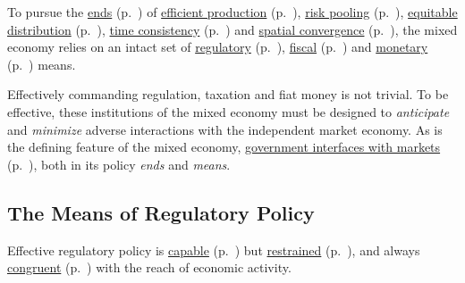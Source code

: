 To pursue the \hyperref[sec:ends]{ends} (p.~\pageref{sec:ends}) of \hyperref[sec:production]{efficient production} (p.~\pageref{sec:production}), \hyperref[sec:risk]{risk pooling} (p.~\pageref{sec:risk}), \hyperref[sec:distribution]{equitable distribution} (p.~\pageref{sec:distribution}), \hyperref[sec:time]{time consistency} (p.~\pageref{sec:time}) and \hyperref[sec:space]{spatial convergence} (p.~\pageref{sec:space}), the mixed economy relies on an intact set of \hyperref[sec:regulatory]{regulatory} (p.~\pageref{sec:regulatory}), \hyperref[sec:fiscal]{fiscal} (p.~\pageref{sec:fiscal}) and \hyperref[sec:monetary]{monetary} (p.~\pageref{sec:monetary}) means.

Effectively commanding regulation, taxation and fiat money is not trivial.
To be effective, these institutions of the mixed economy must be designed to \emph{anticipate} and \emph{minimize} adverse interactions with the independent market economy.
As is the defining feature of the mixed economy, \hyperref[sec:interface]{government interfaces with markets} (p.~\pageref{sec:interface}), both in its policy \emph{ends} and \emph{means}.

\subsection[Regulatory Policy]{The Means of Regulatory Policy} \label{sec:regulatory}

Effective regulatory policy is \hyperref[itm:capability]{capable} (p.~\pageref{itm:capability}) but \hyperref[itm:restraint]{restrained} (p.~\pageref{itm:restraint}), and always \hyperref[itm:congruence]{congruent} (p.~\pageref{itm:congruence}) with the reach of economic activity.

